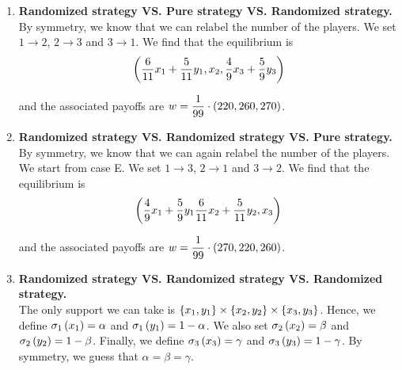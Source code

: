 \begin{enumerate} [label=\Alph*. ]
	      Indeed, we have $\dfrac{260}{99} \geq \dfrac{120}{99}$.
	      	              
	      \vspace{5mm}
	      	              
	      Putting everything together, we find that the equilibrium is
	      \begin{equation*}
	      	\parent{x_1,
	      		\dfrac{4}{9} x_2 + \dfrac{5}{9} y_2,
	      		\dfrac{6}{11} x_3 + \dfrac{5}{11} y_3}
	      \end{equation*}
	      	              
	      and the associated payoffs are $w = \dfrac{1}{99} \cdot \parent{260, 270, 220}$.
	      	              
	      	              
	      	              
	\item \textbf{Randomized strategy VS. Pure strategy VS. Randomized strategy.} \\
	      By symmetry, we know that we can relabel the number of the players. We set $1 \rightarrow 2$, $2 \rightarrow 3$ and $3 \rightarrow 1$. We find that the equilibrium is
	      \begin{equation*}
	      	\left(\dfrac{6}{11} x_1 + \dfrac{5}{11} y_1,
	      		x_2,
	      		\dfrac{4}{9} x_3 + \dfrac{5}{9} y_3\right)
	      \end{equation*}
	      	              
	      and the associated payoffs are $w = \dfrac{1}{99} \cdot \left(220, 260, 270\right)$.
	      	                  
	      	          
	\item \textbf{Randomized strategy VS. Randomized strategy VS. Pure strategy.} \\
	      By symmetry, we know that we can again relabel the number of the players. We start from case E. We set $1 \rightarrow 3$, $2 \rightarrow 1$ and $3 \rightarrow 2$. We find that the equilibrium is
	      \begin{equation*}
	      	\left(\dfrac{4}{9} x_1 + \dfrac{5}{9} y_1
	      		\dfrac{6}{11} x_2 + \dfrac{5}{11} y_2,
	      	x_3\right)
	      \end{equation*}
	      	              
	      and the associated payoffs are $w = \dfrac{1}{99} \cdot \left(270, 220, 260\right)$.
	      	                  
	\item \textbf{Randomized strategy VS. Randomized strategy VS. Randomized strategy.} \\
	      The only support we can take is $\left\{x_1, y_1\right\} \times \left\{x_2, y_2\right\} \times \left\{x_3, y_3\right\}$.
	      Hence, we define $\sigma_{1} \left(x_1\right) = \alpha$ and $\sigma_{1} \left(y_1\right) = 1 - \alpha$.
	      We also set $\sigma_{2} \left(x_2\right) = \beta$ and $\sigma_{2} \left(y_2\right) = 1 - \beta$.
	      Finally, we define $\sigma_{3} \left(x_3\right) = \gamma$ and $\sigma_{3} \left(y_3\right) = 1 - \gamma$.  
	      By symmetry, we guess that $\alpha = \beta = \gamma$.
	      	      

\end{enumerate}
